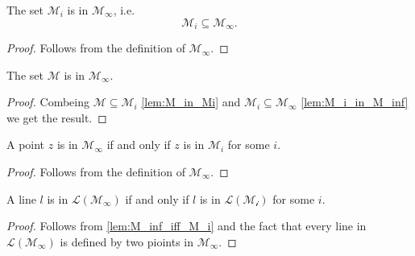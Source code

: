 \begin{lemma}
    \label{lem:M_i_in_M_inf}
    \leanok
    The set $\mathcal{M}_i$ is in $\mathcal{M}_{\infty}$, i.e. $$\mathcal{M}_i \subseteq \mathcal{M}_{\infty}.$$
\end{lemma}
\begin{proof}
    Follows from the definition of $\mathcal{M}_{\infty}$.
\end{proof}

\begin{lemma}
    \label{lem:M_in_M_inf}
    \leanok
    The set $\mathcal{M}$ is in $\mathcal{M}_{\infty}$.
\end{lemma}
\begin{proof}
    Combeing $\mathcal{M} \subseteq \mathcal{M}_i$ \ref{lem:M_in_Mi} and $\mathcal{M}_i \subseteq \mathcal{M}_{\infty}$ \ref{lem:M_i_in_M_inf} we get the result.
\end{proof}

\begin{lemma}
    \label{lem:M_inf_iff_M_i}
    \leanok
    A point $z$ is in $\mathcal{M}_{\infty}$ if and only if $z$ is in $\mathcal{M}_i$ for some $i$.
\end{lemma}
\begin{proof}
    Follows from the definition of $\mathcal{M}_{\infty}$.
\end{proof}

\begin{corollary}
    \label{cor:L_M_inf_iff_L_M_i}
    \leanok
    A line $l$ is in $\mathcal{L(M_{\infty})}$ if and only if $l$ is in $\mathcal{L(M_i)}$ for some $i$.
\end{corollary}
\begin{proof}
    Follows from \ref{lem:M_inf_iff_M_i} and the fact that every line in $\mathcal{L(M_{\infty})}$ is defined by two pioints in $\mathcal{M_{\infty}}$.
\end{proof}

